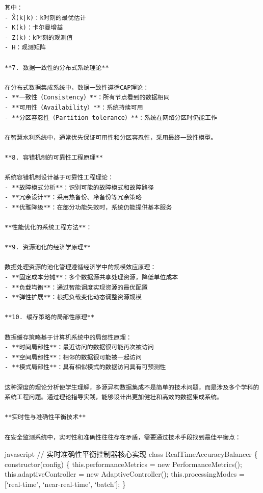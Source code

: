 \begin{lstlisting}
其中：
- X̂(k|k)：k时刻的最优估计
- K(k)：卡尔曼增益
- Z(k)：k时刻的观测值
- H：观测矩阵

**7. 数据一致性的分布式系统理论**

在分布式数据集成系统中，数据一致性遵循CAP理论：
- **一致性（Consistency）**：所有节点看到的数据相同
- **可用性（Availability）**：系统持续可用
- **分区容忍性（Partition tolerance）**：系统在网络分区时仍能工作

在智慧水利系统中，通常优先保证可用性和分区容忍性，采用最终一致性模型。

**8. 容错机制的可靠性工程原理**

系统容错机制设计基于可靠性工程理论：
- **故障模式分析**：识别可能的故障模式和故障路径
- **冗余设计**：采用热备份、冷备份等冗余策略
- **优雅降级**：在部分功能失效时，系统仍能提供基本服务

**性能优化的系统工程方法**：

**9. 资源池化的经济学原理**

数据处理资源的池化管理遵循经济学中的规模效应原理：
- **固定成本分摊**：多个数据源共享处理资源，降低单位成本
- **负载均衡**：通过智能调度实现资源的最优配置
- **弹性扩展**：根据负载变化动态调整资源规模

**10. 缓存策略的局部性原理**

数据缓存策略基于计算机系统中的局部性原理：
- **时间局部性**：最近访问的数据很可能再次被访问
- **空间局部性**：相邻的数据很可能被一起访问
- **模式局部性**：具有相似模式的数据访问具有可预测性

这种深度的理论分析使学生理解，多源异构数据集成不是简单的技术问题，而是涉及多个学科的系统工程问题。通过理论指导实践，能够设计出更加健壮和高效的数据集成系统。

**实时性与准确性平衡技术**

在安全监测系统中，实时性和准确性往往存在矛盾，需要通过技术手段找到最佳平衡点：
\end{lstlisting}

javascript // 实时准确性平衡控制器核心实现 class RealTimeAccuracyBalancer \{ constructor(config) \{ this.performanceMetrics = new PerformanceMetrics(); this.adaptiveController = new AdaptiveController(); this.processingModes = {[}`real-time', `near-real-time', `batch'{]}; \}

